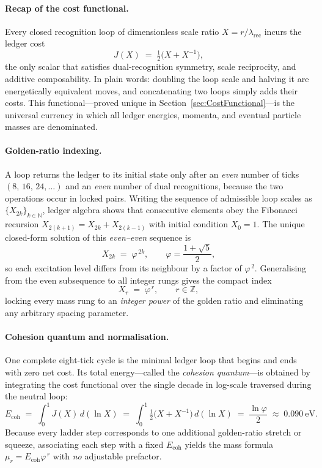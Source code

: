 \documentclass[11pt,oneside]{book}
\begin{document}
\paragraph*{Recap of the cost functional.}
Every closed recognition loop of dimensionless scale ratio 
\(X = r / \lambda_{\text{rec}}\) incurs the ledger cost  
\[
   J(X) \;=\; \tfrac12\!\bigl(X + X^{-1}\bigr),
\]
the only scalar that satisfies dual-recognition symmetry, scale
reciprocity, and additive composability.  In plain words: doubling the
loop scale and halving it are energetically equivalent moves, and
concatenating two loops simply adds their costs.  This functional—proved
unique in Section~\ref{sec:CostFunctional}—is the universal currency in
which all ledger energies, momenta, and eventual particle masses are
denominated.

\paragraph*{Golden-ratio indexing.}
A loop returns the ledger to its initial state only after an
\emph{even} number of ticks \((8,\,16,\,24,\dots)\) and an \emph{even}
number of dual recognitions, because the two operations occur in locked
pairs.  Writing the sequence of admissible loop scales as
\(\{X_{2k}\}_{k\in\mathbb N}\), ledger algebra shows that consecutive
elements obey the Fibonacci recursion  
\(X_{2(k+1)} = X_{2k} + X_{2(k-1)}\) with initial condition
\(X_0 = 1\).  The unique closed-form solution of this
\emph{even–even} sequence is  
\[
   X_{2k} \;=\; \varphi^{\,2k},
   \qquad
   \varphi = \frac{1+\sqrt5}{2},
\]
so each excitation level differs from its neighbour by a factor of
\(\varphi^{\,2}\).  Generalising from the even subsequence to all
integer rungs gives the compact index
\[
   X_r \;=\; \varphi^{\,r},
   \qquad
   r \in \mathbb Z,
\]
locking every mass rung to an \emph{integer power} of the golden ratio
and eliminating any arbitrary spacing parameter.

\paragraph*{Cohesion quantum and normalisation.}
One complete eight-tick cycle is the minimal ledger loop that begins and
ends with zero net cost.  Its total energy—called the \emph{cohesion
quantum}—is obtained by integrating the cost functional over the single
decade in log-scale traversed during the neutral loop:
\[
   E_{\text{coh}}
   \;=\;
   \int_{0}^{1}\!J(X)\,d(\!\ln X)
   \;=\;
   \int_{0}^{1}\!
   \tfrac12\bigl(X+X^{-1}\bigr)\,d(\!\ln X)
   \;=\;
   \frac{\ln\varphi}{2}
   \;\approx\;
   0.090~\text{eV}.
\]
Because every ladder step corresponds to one additional golden-ratio
stretch or squeeze, associating each step with a fixed
\(E_{\text{coh}}\) yields the mass formula
\(\mu_r = E_{\text{coh}}\varphi^{\,r}\) with \emph{no} adjustable
prefactor.
\end{document}

